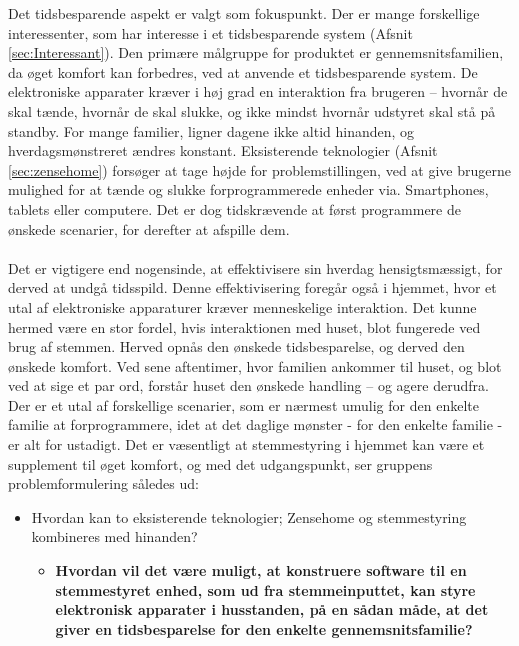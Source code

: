 Det tidsbesparende aspekt er valgt som fokuspunkt. Der er mange forskellige interessenter, som har interesse i et tidsbesparende system (Afsnit \ref{sec:Interessant}). Den primære målgruppe for produktet er gennemsnitsfamilien, da øget komfort kan forbedres, ved at anvende et tidsbesparende system. De elektroniske apparater kræver i høj grad en interaktion fra brugeren – hvornår de skal tænde, hvornår de skal slukke, og ikke mindst hvornår udstyret skal stå på standby. For mange familier, ligner dagene ikke altid hinanden, og hverdagsmønstreret ændres konstant. Eksisterende teknologier (Afsnit \ref{sec:zensehome}) forsøger at tage højde for problemstillingen, ved at give brugerne mulighed for at tænde og slukke forprogrammerede enheder via. Smartphones, tablets eller computere. Det er dog tidskrævende at først programmere de ønskede scenarier, for derefter at afspille dem. \\\\
Det er vigtigere end nogensinde, at effektivisere sin hverdag hensigtsmæssigt, for derved at undgå tidsspild. Denne effektivisering foregår også i hjemmet, hvor et utal af elektroniske apparaturer kræver menneskelige interaktion. Det kunne hermed være en stor fordel, hvis interaktionen med huset, blot fungerede ved brug af stemmen. Herved opnås den ønskede tidsbesparelse, og derved den ønskede komfort. Ved sene aftentimer, hvor familien ankommer til huset, og blot ved at sige et par ord, forstår huset den ønskede handling – og agere derudfra. Der er et utal af forskellige scenarier, som er nærmest umulig for den enkelte familie at forprogrammere, idet at det daglige mønster - for den enkelte familie - er alt for ustadigt. Det er væsentligt at stemmestyring i hjemmet kan være et supplement til øget komfort, og med det udgangspunkt, ser gruppens problemformulering således ud: 
\begin{itemize}
    \item Hvordan kan to eksisterende teknologier; Zensehome og stemmestyring kombineres med hinanden? \\
    \begin{itemize}
        \item{\bf Hvordan vil det være muligt, at konstruere software til en stemmestyret enhed, som ud fra stemmeinputtet, kan styre elektronisk apparater i husstanden, på en sådan måde, at det giver en tidsbesparelse for den enkelte gennemsnitsfamilie?}
    \end{itemize} 
\end{itemize} 